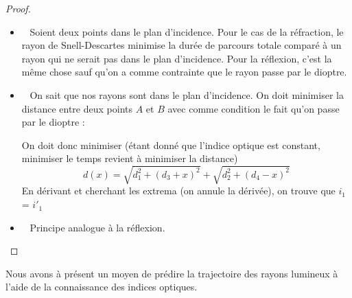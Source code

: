 \documentclass{classe}
\newcommand{\point}[3]{\draw (#1 -.1, #2 -.1) -- (#1 + .1, #2 + .1);
\draw (#1 +.1, #2 -.1) -- (#1 - .1, #2 + .1);
\draw (#1, #2) node[below right]{#3};}
\begin{document}
\begin{proof}
\begin{itemize}
	\item \color{vulm}{Plan d'incidence :}\ \color{black} Soient deux points dans le plan d'incidence. Pour le cas de la réfraction, le rayon de Snell-Descartes minimise la durée de parcours totale comparé à un rayon qui ne serait pas dans le plan d'incidence. Pour la réflexion, c'est la même chose sauf qu'on a comme contrainte que le rayon passe par le dioptre.
	\item \color{vulm}{Réflexion :}\ \color{black} On sait que nos rayons sont dans le plan d'incidence. On doit minimiser la distance entre deux points $A$ et $B$ avec comme condition le fait qu'on passe par le dioptre :
	\begin{figure}[H]
	\centering
	\end{figure}
	\noindent On doit donc minimiser (étant donné que l'indice optique est constant, minimiser le temps revient à minimiser la distance)
	\begin{equation*}
	d(x) = \sqrt{d_1^2+(d_3+x)^2} + \sqrt{d_2^2+(d_4-x)^2}
	\end{equation*}
	En dérivant et cherchant les extrema (on annule la dérivée), on trouve que $i_1$ = $i'_1$
	\item \color{vulm}{Réfraction :}\ \color{black} Principe analogue à la réflexion.

\end{itemize}
\end{proof}
Nous avons à présent un moyen de prédire la trajectoire des rayons lumineux à l'aide de la connaissance des indices optiques.
\end{document}
